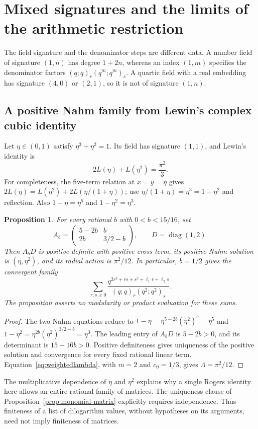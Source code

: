 \documentclass[11pt,reqno]{amsart}
\newtheorem{proposition}[theorem]{Proposition}
\theoremstyle{remark}
\numberwithin{equation}{section}
\begin{document}
\section{Mixed signatures and the limits of the arithmetic restriction}
\label{sec:signature}
The field signature and the denominator steps are different data. A
number field of signature $(1,n)$ has degree $1+2n$, whereas an index
$(1,m)$ specifies the denominator factors $(q;q)_r(q^m;q^m)_s$.
A quartic field with a real embedding has signature $(4,0)$ or $(2,1)$,
so it is not of signature $(1,n)$.

\subsection{A positive Nahm family from Lewin's complex cubic identity}
Let $\eta\in(0,1)$ satisfy $\eta^3+\eta^2=1$. Its field has signature
$(1,1)$, and Lewin's identity is
\begin{equation}\label{eq:lewin-synthesis}
 2L(\eta)+L(\eta^2)=\frac{\pi^2}{3}.
\end{equation}
For completeness, the five-term relation at $x=y=\eta$ gives
$2L(\eta)=L(\eta^2)+2L(\eta/(1+\eta))$; use
$\eta/(1+\eta)=\eta^3=1-\eta^2$ and reflection. Also
$1-\eta=\eta^5$ and $1-\eta^2=\eta^3$.

\begin{proposition}\label{prop:lewin-family}
For every rational $b$ with $0<b<15/16$, set
\[
 A_b=\begin{pmatrix}5-2b&b\\2b&3/2-b\end{pmatrix},\qquad
 D=\operatorname{diag}(1,2).
\]
Then $A_bD$ is positive definite with positive cross term, its positive
Nahm solution is $(\eta,\eta^2)$, and its radial action is $\pi^2/12$.
In particular, $b=1/2$ gives the convergent family
\begin{equation}\label{eq:lewin-sums}
 \sum_{r,s\geq0}
 \frac{q^{2r^2+rs+s^2+\ell_1r+\ell_2s}}
 {(q;q)_r(q^2;q^2)_s}.
\end{equation}
The proposition asserts no modularity or product evaluation for these sums.
\end{proposition}
\begin{proof}
The two Nahm equations reduce to
$1-\eta=\eta^{5-2b}(\eta^2)^b=\eta^5$ and
$1-\eta^2=\eta^{2b}(\eta^2)^{3/2-b}=\eta^3$.
The leading entry of $A_bD$ is $5-2b>0$, and its determinant is
$15-16b>0$. Positive definiteness gives uniqueness of the positive
solution and convergence for every fixed rational linear term.
Equation~\eqref{eq:weightedlambda}, with $m=2$ and $c_0=1/3$,
gives $\Lambda=\pi^2/12$.
\end{proof}
The multiplicative dependence of $\eta$ and $\eta^2$ explains why a
single Rogers identity here allows an entire rational family of matrices.
The uniqueness clause of Proposition~\ref{prop:monomial-matrix} explicitly
requires independence. Thus finiteness of a list of dilogarithm values,
without hypotheses on its arguments, need not imply finiteness of matrices.
\end{document}
